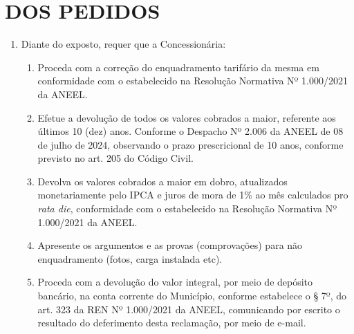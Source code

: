 \section{DOS PEDIDOS}

\begin{enumerate}[resume]
\item 
Diante do exposto, requer que a Concessionária:

\begin{enumerate}
\item 
Proceda com a correção do enquadramento tarifário da mesma em conformidade com o estabelecido na Resolução Normativa Nº 1.000/2021 da ANEEL.
\item 
Efetue a devolução de todos os valores cobrados a maior, referente aos últimos 10 (dez) anos. Conforme o Despacho Nº 2.006 da ANEEL de 08 de julho de 2024, observando o prazo prescricional de 10 anos, conforme previsto no art. 205 do Código Civil.
\item 
Devolva os valores cobrados a maior em dobro, atualizados monetariamente pelo IPCA e juros de mora de 1\% ao mês calculados pro \textit{rata die}, conformidade com o estabelecido na Resolução Normativa Nº 1.000/2021 da ANEEL.   
\item 
Apresente os argumentos e as provas (comprovações) para não enquadramento (fotos, carga instalada etc).   
\item 
Proceda com a devolução do valor integral, por meio de depósito bancário, na conta corrente do Município, conforme estabelece o § 7º, do art. 323 da REN Nº 1.000/2021 da ANEEL, comunicando por escrito o resultado do deferimento desta reclamação, por meio de e-mail.

\end{enumerate}
\end{enumerate}